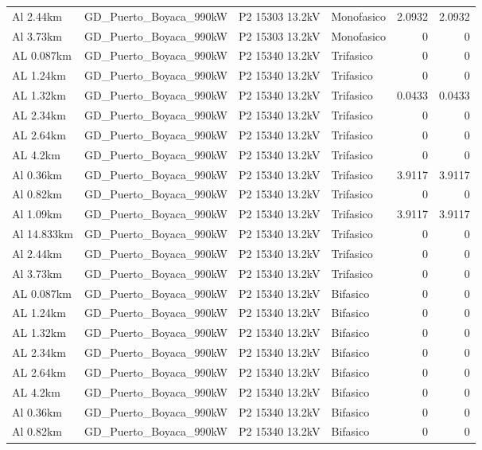 \documentclass[11pt,a4paper]{article}
\begin{document}
\begin{longtable}{llllrr}
Al 2.44km & GD\_Puerto\_Boyaca\_990kW & P2 15303 13.2kV & Monofasico & 2.0932 & 2.0932 \\
Al 3.73km & GD\_Puerto\_Boyaca\_990kW & P2 15303 13.2kV & Monofasico & 0 & 0 \\
AL 0.087km & GD\_Puerto\_Boyaca\_990kW & P2 15340 13.2kV & Trifasico & 0 & 0 \\
AL 1.24km & GD\_Puerto\_Boyaca\_990kW & P2 15340 13.2kV & Trifasico & 0 & 0 \\
AL 1.32km & GD\_Puerto\_Boyaca\_990kW & P2 15340 13.2kV & Trifasico & 0.0433 & 0.0433 \\
AL 2.34km & GD\_Puerto\_Boyaca\_990kW & P2 15340 13.2kV & Trifasico & 0 & 0 \\
AL 2.64km & GD\_Puerto\_Boyaca\_990kW & P2 15340 13.2kV & Trifasico & 0 & 0 \\
AL 4.2km & GD\_Puerto\_Boyaca\_990kW & P2 15340 13.2kV & Trifasico & 0 & 0 \\
Al 0.36km & GD\_Puerto\_Boyaca\_990kW & P2 15340 13.2kV & Trifasico & 3.9117 & 3.9117 \\
Al 0.82km & GD\_Puerto\_Boyaca\_990kW & P2 15340 13.2kV & Trifasico & 0 & 0 \\
Al 1.09km & GD\_Puerto\_Boyaca\_990kW & P2 15340 13.2kV & Trifasico & 3.9117 & 3.9117 \\
Al 14.833km & GD\_Puerto\_Boyaca\_990kW & P2 15340 13.2kV & Trifasico & 0 & 0 \\
Al 2.44km & GD\_Puerto\_Boyaca\_990kW & P2 15340 13.2kV & Trifasico & 0 & 0 \\
Al 3.73km & GD\_Puerto\_Boyaca\_990kW & P2 15340 13.2kV & Trifasico & 0 & 0 \\
AL 0.087km & GD\_Puerto\_Boyaca\_990kW & P2 15340 13.2kV & Bifasico & 0 & 0 \\
AL 1.24km & GD\_Puerto\_Boyaca\_990kW & P2 15340 13.2kV & Bifasico & 0 & 0 \\
AL 1.32km & GD\_Puerto\_Boyaca\_990kW & P2 15340 13.2kV & Bifasico & 0 & 0 \\
AL 2.34km & GD\_Puerto\_Boyaca\_990kW & P2 15340 13.2kV & Bifasico & 0 & 0 \\
AL 2.64km & GD\_Puerto\_Boyaca\_990kW & P2 15340 13.2kV & Bifasico & 0 & 0 \\
AL 4.2km & GD\_Puerto\_Boyaca\_990kW & P2 15340 13.2kV & Bifasico & 0 & 0 \\
Al 0.36km & GD\_Puerto\_Boyaca\_990kW & P2 15340 13.2kV & Bifasico & 0 & 0 \\
Al 0.82km & GD\_Puerto\_Boyaca\_990kW & P2 15340 13.2kV & Bifasico & 0 & 0 \\

\end{longtable}
\end{document}

